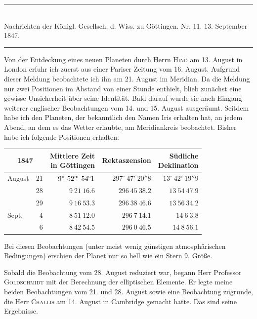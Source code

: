 \clearpage
{}
\begin{center}
\rule{0.55\linewidth}{0.4pt}\\[2pt]
Nachrichten der Königl. Gesellsch. d. Wiss. zu Göttingen. Nr. 11. 13. September 1847.\\[2pt]
\rule{0.55\linewidth}{0.4pt}
\end{center}

Von der Entdeckung eines neuen Planeten durch Herrn \textsc{Hind} am 13. August in London erfuhr ich zuerst aus einer Pariser Zeitung vom 16. August. Aufgrund dieser Meldung beobachtete ich ihn am 21. August im Meridian. Da die Meldung nur zwei Positionen im Abstand von einer Stunde enthielt, blieb zunächst eine gewisse Unsicherheit über seine Identität. Bald darauf wurde sie nach Eingang weiterer englischer Beobachtungen vom 14. und 15. August ausgeräumt. Seitdem habe ich den Planeten, der bekanntlich den Namen Iris erhalten hat, an jedem Abend, an dem es das Wetter erlaubte, am Meridiankreis beobachtet. Bisher habe ich folgende Positionen erhalten.

\begin{center}
\setlength{\tabcolsep}{4pt}
\begin{tabular}{lr|r|r|r}
\multicolumn{2}{c|}{1847} & \shortstack{Mittlere Zeit\\in Göttingen} & Rektaszension & \shortstack{Südliche\\Deklination} \\\hline
August & 21 & $9^{\rm u}\ 52^{\rm m}\ 54^{\rm s}1$ & $297^\circ\ 47'\ 20''8$ & $13^\circ\ 42'\ 19''9$ \\
 & 28 & $9\ 21\ 16.6$ & $296\ 45\ 38.2$ & $13\ 54\ 47.9$ \\
 & 29 & $9\ 16\ 53.3$ & $296\ 38\ 46.6$ & $13\ 56\ 34.2$ \\
Sept. & 4 & $8\ 51\ 12.0$ & $296\ 7\ 14.1$ & $14\ 6\ 3.8$ \\
 & 6 & $8\ 42\ 54.5$ & $296\ 0\ 46.5$ & $14\ 8\ 56.1$ \\
\end{tabular}
\end{center}

Bei diesen Beobachtungen (unter meist wenig günstigen atmosphärischen Bedingungen) erschien der Planet nur so hell wie ein Stern 9. Größe.

Sobald die Beobachtung vom 28. August reduziert war, begann Herr Professor \textsc{Goldschmidt} mit der Berechnung der elliptischen Elemente. Er legte meine beiden Beobachtungen vom 21. und 28. August sowie eine Beobachtung zugrunde, die Herr \textsc{Challis} am 14. August in Cambridge gemacht hatte. Das sind seine Ergebnisse.

